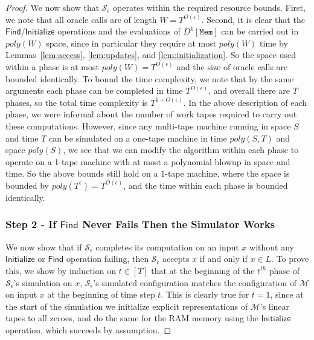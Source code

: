 \documentclass[11pt]{article}
\begin{document}
\begin{proof}
We now show that $\mathcal{S}_{\epsilon}$ operates within the required resource bounds. First, we note that all oracle calls are of length $W = T^{O(\epsilon)}$. Second, it is clear that the $\mathsf{Find}$/$\mathsf{Initialize}$ operations and the evaluations of $D^k[\mathtt{Mem}]$ can be carried out in $poly(W)$ space, since in particular they require at most $poly(W)$ time by Lemmas~\ref{lem:access}, \ref{lem:updates}, and \ref{lem:initialization}. So the space used within a phase is at most $poly(W) = T^{O(\epsilon)}$ and the size of oracle calls are bounded identically. To bound the time complexity, we note that by the same arguments each phase can be completed in time $T^{O(\epsilon)}$, and overall there are $T$ phases, so the total time complexity is $T^{1 + O(\epsilon)}$. In the above description of each phase, we were informal about the number of work tapes required to carry out these computations. However, since any multi-tape machine running in space $S$ and time $T$ can be simulated on a one-tape machine in time $poly(S,T)$ and space $poly(S)$, we see that we can modify the algorithm within each phase to operate on a 1-tape machine with at most a polynomial blowup in space and time. So the above bounds still hold on a 1-tape machine, where the space is bounded by $poly(T^{\epsilon})= T^{O(\epsilon)}$, and the time within each phase is bounded identically.

\subsubsection*{Step 2 - If $\mathsf{Find}$ Never Fails Then the Simulator Works}
We now show that if $\mathcal{S}_{\epsilon}$ completes its computation on an input $x$ without any $\mathsf{Initialize}$ or $\mathsf{Find}$ operation failing, then $\mathcal{S}_{\epsilon}$ accepts $x$ if and only if $x \in L$. To prove this, we show by induction on $t \in [T]$ that at the beginning of the $t^{th}$ phase of $\mathcal{S}_{\epsilon}$'s simulation on $x$, $\mathcal{S}_{\epsilon}$'s simulated configuration matches the configuration of $\mathcal{M}$ on input $x$ at the beginning of time step $t$. This is clearly true for $t = 1$, since at the start of the simulation we initialize explicit representations of $\mathcal{M}$'s linear tapes to all zeroes, and do the same for the RAM memory using the $\mathsf{Initialize}$ operation, which succeeds by assumption.


\end{proof}
\end{document}
